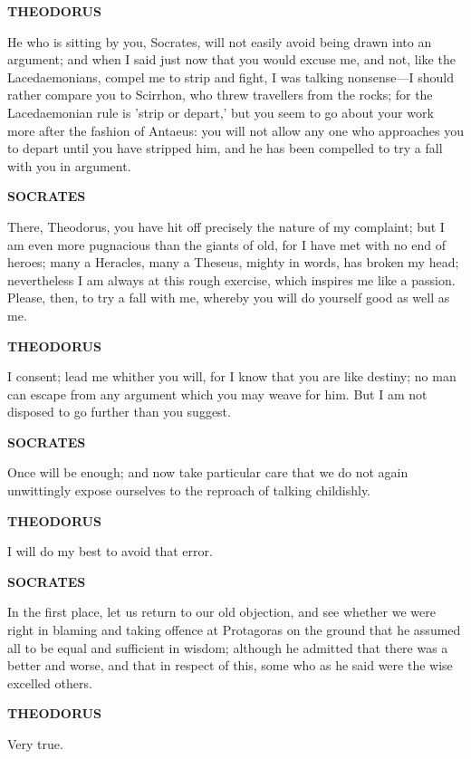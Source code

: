 \documentclass[11pt,letter]{article}
\begin{document}
\par \textbf{THEODORUS}
\par   He who is sitting by you, Socrates, will not easily avoid being drawn into an argument; and when I said just now that you would excuse me, and not, like the Lacedaemonians, compel me to strip and fight, I was talking nonsense—I should rather compare you to Scirrhon, who threw travellers from the rocks; for the Lacedaemonian rule is 'strip or depart,' but you seem to go about your work more after the fashion of Antaeus:  you will not allow any one who approaches you to depart until you have stripped him, and he has been compelled to try a fall with you in argument.

\par \textbf{SOCRATES}
\par   There, Theodorus, you have hit off precisely the nature of my complaint; but I am even more pugnacious than the giants of old, for I have met with no end of heroes; many a Heracles, many a Theseus, mighty in words, has broken my head; nevertheless I am always at this rough exercise, which inspires me like a passion. Please, then, to try a fall with me, whereby you will do yourself good as well as me.

\par \textbf{THEODORUS}
\par   I consent; lead me whither you will, for I know that you are like destiny; no man can escape from any argument which you may weave for him. But I am not disposed to go further than you suggest.

\par \textbf{SOCRATES}
\par   Once will be enough; and now take particular care that we do not again unwittingly expose ourselves to the reproach of talking childishly.

\par \textbf{THEODORUS}
\par   I will do my best to avoid that error.

\par \textbf{SOCRATES}
\par   In the first place, let us return to our old objection, and see whether we were right in blaming and taking offence at Protagoras on the ground that he assumed all to be equal and sufficient in wisdom; although he admitted that there was a better and worse, and that in respect of this, some who as he said were the wise excelled others.

\par \textbf{THEODORUS}
\par   Very true.
\end{document}
